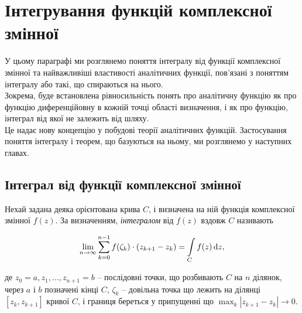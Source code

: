 
% 

% 

\setcounter{section}{3}
\section{Інтегрування функцій комплексної змінної}

У цьому параграфі ми розглянемо поняття інтегралу від функції комплексної змінної та найважливіші властивості аналітичних функції, пов'язані з поняттям інтегралу або такі, що спираються на нього. \\

Зокрема, буде встановлена рівносильність понять про аналітичну функцію як про функцію диференційовну в кожній точці області визначення, і як про функцію, інтеграл від якої не залежить від шляху. \\

Це надає нову концепцію у побудові теорії аналітичних функцій. Застосування поняття інтегралу і теорем, що базуються на ньому, ми розглянемо у наступних главах.

\subsection{Інтеграл від функції комплексної змінної}

Нехай задана деяка орієнтована крива $C$, і визначена на ній функція комплексної змінної $f(z)$. За визначенням, \textit{інтегралом} від $f(z)$ вздовж $C$ називають

\begin{equation}
	\label{eq:4.1.1}
	\displaystyle\lim\limits_{n \to \infty} \displaystyle\sum\limits_{k = 0}^{n - 1} f(\zeta_k) \cdot (z_{k + 1} - z_k) = \displaystyle\int\limits_C f(z) \mathop{}\!\mathrm{d} z,
\end{equation}

де $z_0 = a, z_1, \ldots, z_{n + 1} = b$ -- послідовні точки, що розбивають $C$ на $n$ ділянок, через $a$ і $b$ позначені кінці $C$, $\zeta_k$ -- довільна точка що лежить на ділянці $[z_k, z_{k + 1}]$ кривої $C$, і границя береться у припущенні що $\max_k |z_{k + 1} - z_k| \to 0$. \\


